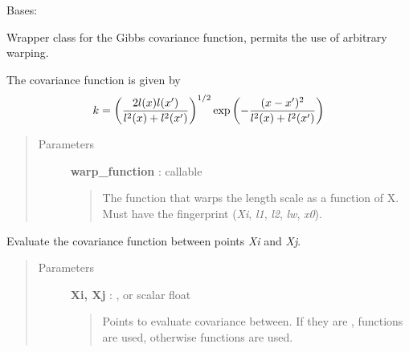 \documentclass[letterpaper,10pt,english]{sphinxmanual}
\begin{document}

\begin{fulllineitems}
\label{gptools.kernel:gptools.kernel.gibbs.GibbsFunction1dArb}
Bases: 

Wrapper class for the Gibbs covariance function, permits the use of arbitrary warping.

The covariance function is given by
\begin{gather}
\begin{split}k = \left ( \frac{2l(x)l(x')}{l^2(x)+l^2(x')} \right )^{1/2}\exp\left ( -\frac{(x-x')^2}{l^2(x)+l^2(x')} \right )\end{split}\notag
\end{gather}\begin{quote}\begin{description}
\item[{Parameters}] \leavevmode
\textbf{warp\_function} : callable
\begin{quote}

The function that warps the length scale as a function of X. Must have
the fingerprint (\emph{Xi}, \emph{l1}, \emph{l2}, \emph{lw}, \emph{x0}).
\end{quote}

\end{description}\end{quote}

\begin{fulllineitems}
\label{gptools.kernel:gptools.kernel.gibbs.GibbsFunction1dArb.__call__}
Evaluate the covariance function between points \emph{Xi} and \emph{Xj}.
\begin{quote}\begin{description}
\item[{Parameters}] \leavevmode
\textbf{Xi, Xj} : ,  or scalar float
\begin{quote}

Points to evaluate covariance between. If they are ,
 functions are used, otherwise 
functions are used.
\end{quote}


\end{description}
\end{quote}
\end{fulllineitems}
\end{fulllineitems}
\end{document}
